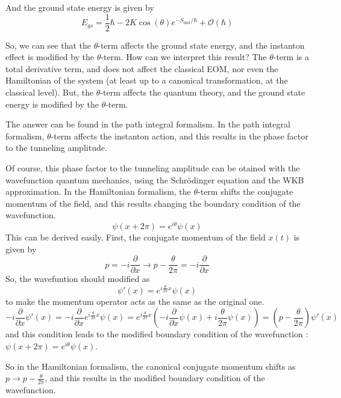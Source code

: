 \documentclass{article}
\begin{document}
And the ground state energy is given by
\[
    E_{gs} = \frac{1}{2}\hbar-2K \cos (\theta ) e^{-S_{\text{inst}}/\hbar}+ \mathcal{O}(\hbar)
\]

So, we can see that the $\theta$-term affects the ground state energy, and the instanton effect is modified by the $\theta$-term.
How can we interpret this result? The $\theta$-term is a total derivative term, and does not affect the classical EOM, nor even the Hamiltonian of the system (at least up to a canonical transformation, at the classical level).
But, the $\theta$-term affects the quantum theory, and the ground state energy is modified by the $\theta$-term.

The answer can be found in the path integral formalism.
In the path integral formalism, $\theta$-term affects the instanton action, and this results in the phase factor to the tunneling amplitude.

Of course, this phase factor to the tunneling amplitude can be otained with the wavefunction quantum mechanics, using the Schrödinger equation and the WKB approximation.
In the Hamiltonian formalism, the $\theta$-term shifts the conjugate momentum of the field, and this results changing the boundary condition of the wavefunction.
\[
    \psi(x+2\pi) = e^{i\theta} \psi(x)
\]
This can be derived easily. First, the conjugate momentum of the field $x(t)$ is given by
\[
    p=-i\frac{\partial}{\partial x} \rightarrow p-\frac{\theta}{2\pi}=-i\frac{\partial}{\partial x}
\]
So, the wavefuntion should modified as
\[
    \psi'(x) = e^{i\frac{\theta}{2\pi} x} \psi(x)
\]
to make the momentum operator acts as the same as the original one.
\[
    -i\frac{\partial}{\partial x} \psi'(x) = -i\frac{\partial}{\partial x} e^{i\frac{\theta}{2\pi} x} \psi(x) = e^{i\frac{\theta}{2\pi} x} (-i\frac{\partial}{\partial x} \psi(x) + i\frac{\theta}{2\pi} \psi(x)) = (p-\frac{\theta}{2\pi}) \psi'(x)
\]
and this condition leads to the modified boundary condition of the wavefunction : $\psi(x+2\pi) = e^{i\theta} \psi(x)$.

So in the Hamiltonian formalism, the canonical conjugate momentum shifts as $p\rightarrow p-\frac{\theta}{2\pi}$, and this results in the modified boundary condition of the wavefunction.
\end{document}
